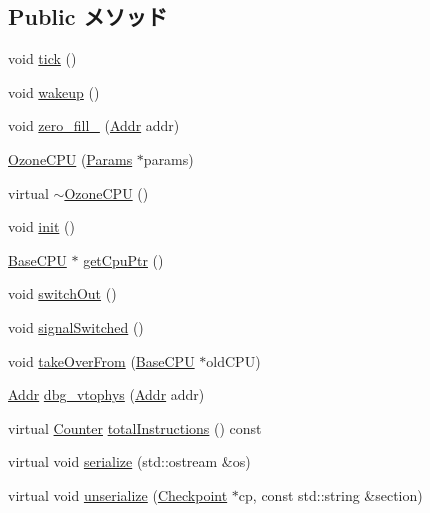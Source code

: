 \subsection*{Public メソッド}
\begin{DoxyCompactItemize}
\item 
void \hyperlink{classOzoneCPU_a873dd91783f9efb4a590aded1f70d6b0}{tick} ()
\item 
void \hyperlink{classOzoneCPU_ae674290a26ecbd622c5160e38e8a4fe9}{wakeup} ()
\item 
void \hyperlink{classOzoneCPU_ab009616bac40c9b920ed54fccca517a9}{zero\_\-fill\_} (\hyperlink{base_2types_8hh_af1bb03d6a4ee096394a6749f0a169232}{Addr} addr)
\item 
\hyperlink{classOzoneCPU_ae0d0d26a28681a61d08286e5dfb85cb6}{OzoneCPU} (\hyperlink{classOzoneCPU_a818e103eae798a24a06a0a34631849ea}{Params} $\ast$params)
\item 
virtual \hyperlink{classOzoneCPU_a10f4512b7ceb84d889fc0057ecd2df6a}{$\sim$OzoneCPU} ()
\item 
void \hyperlink{classOzoneCPU_a02fd73d861ef2e4aabb38c0c9ff82947}{init} ()
\item 
\hyperlink{classBaseCPU_1_1BaseCPU}{BaseCPU} $\ast$ \hyperlink{classOzoneCPU_a4f35ce7d5cb2ec57504bc2c2bc03c879}{getCpuPtr} ()
\item 
void \hyperlink{classOzoneCPU_a05f299b443f8cc73a93d61572edc0218}{switchOut} ()
\item 
void \hyperlink{classOzoneCPU_a530eaaf1e3da16d4de8ec649914c8512}{signalSwitched} ()
\item 
void \hyperlink{classOzoneCPU_ac82d2b8d331b2e8e6854a95d2917dfa2}{takeOverFrom} (\hyperlink{classBaseCPU_1_1BaseCPU}{BaseCPU} $\ast$oldCPU)
\item 
\hyperlink{base_2types_8hh_af1bb03d6a4ee096394a6749f0a169232}{Addr} \hyperlink{classOzoneCPU_a7e2d118d430dcbebd896ba39811ef03b}{dbg\_\-vtophys} (\hyperlink{base_2types_8hh_af1bb03d6a4ee096394a6749f0a169232}{Addr} addr)
\item 
virtual \hyperlink{base_2types_8hh_ae1475755791765b8e6f6a8bb091e273e}{Counter} \hyperlink{classOzoneCPU_ac022175ac3b2a7117d4c6c283f1ac278}{totalInstructions} () const 
\item 
virtual void \hyperlink{classOzoneCPU_a53e036786d17361be4c7320d39c99b84}{serialize} (std::ostream \&os)
\item 
virtual void \hyperlink{classOzoneCPU_af22e5d6d660b97db37003ac61ac4ee49}{unserialize} (\hyperlink{classCheckpoint}{Checkpoint} $\ast$cp, const std::string \&section)

\end{DoxyCompactItemize}

